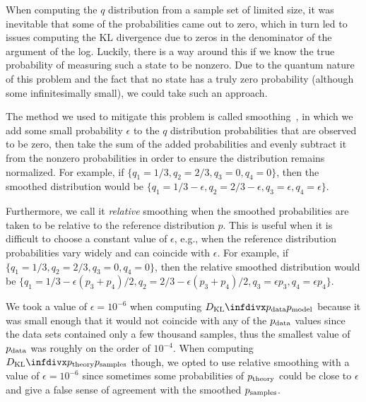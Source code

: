 When computing the \( q \) distribution from a sample set of limited size, it was inevitable that some of the probabilities came out to zero, which in turn led to issues computing the KL divergence due to zeros in the denominator of the argument of the log.
Luckily, there is a way around this if we know the true probability of measuring such a state to be nonzero.
Due to the quantum nature of this problem and the fact that no state has a truly zero probability (although some infinitesimally small), we could take such an approach.

The method we used to mitigate this problem is called smoothing~\cite{han_kl_divergence}, in which we add some small probability \( \epsilon \) to the \( q \) distribution probabilities that are observed to be zero, then take the sum of the added probabilities and evenly subtract it from the nonzero probabilities in order to ensure the distribution remains normalized.
For example, if \( \{q_1 = 1/3, q_2 = 2/3, q_3 = 0, q_4 = 0\} \), then the smoothed distribution would be \( \{q_1 = 1/3 - \epsilon, q_2 = 2/3 - \epsilon, q_3 = \epsilon, q_4 = \epsilon\} \).

Furthermore, we call it \textit{relative} smoothing when the smoothed probabilities are taken to be relative to the reference distribution \( p \).
This is useful when it is difficult to choose a constant value of \( \epsilon \), e.g., when the reference distribution probabilities vary widely and can coincide with \( \epsilon \).
For example, if \( \{q_1 = 1/3, q_2 = 2/3, q_3 = 0, q_4 = 0\} \), then the relative smoothed distribution would be \( \{q_1 = 1/3 - \epsilon (p_3 + p_4)/2, q_2 = 2/3 - \epsilon (p_3 + p_4)/2, q_3 = \epsilon p_3, q_4 = \epsilon p_4\} \).

We took a value of \( \epsilon = 10^{-6} \) when computing \( \DKL{\pdata}{\pmodel} \) because it was small enough that it would not coincide with any of the \( p_{\text{data}} \) values since the data sets contained only a few thousand samples, thus the smallest value of \( p_{\text{data}} \) was roughly on the order of \( 10^{-4} \).
When computing \( \DKL{\ptheory}{\psamples} \) though, we opted to use relative smoothing with a value of \( \epsilon = 10^{-6} \) since sometimes some probabilities of \( p_{\text{theory}} \) could be close to \( \epsilon \) and give a false sense of agreement with the smoothed \( p_{\text{samples}} \).

